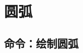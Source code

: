 \documentclass[../main.tex]{subfiles}
\begin{document}
\section{圆弧}

\subsection{命令：绘制圆弧}
%
%
%
%
%
%
\end{document}
